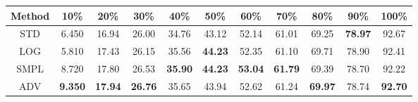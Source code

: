 \documentclass{standalone}
\begin{document}
\begin{tabular}{c|cccccccccc}
      \toprule
      Method & 10\% & 20\% & 30\% & 40\% & 50\% & 60\% & 70\% & 80\% & 90\% & 100\% \\
      \midrule
STD & 6.450 & 16.94 & 26.00 & 34.76 & 43.12 & 52.14 & 61.01 & 69.25 & \textbf{78.97} & 92.67\\
LOG & 5.810 & 17.43 & 26.15 & 35.56 & \textbf{44.23} & 52.35 & 61.10 & 69.71 & 78.90 & 92.41\\
SMPL & 8.720 & 17.80 & 26.53 & \textbf{35.90} & \textbf{44.23} & \textbf{53.04} & \textbf{61.79} & 69.39 & 78.70 & 92.22\\
ADV & \textbf{9.350} & \textbf{17.94} & \textbf{26.76} & 35.65 & 43.94 & 52.62 & 61.24 & \textbf{69.97} & 78.74 & \textbf{92.70}\\
  \bottomrule
\end{tabular}
\end{document}
